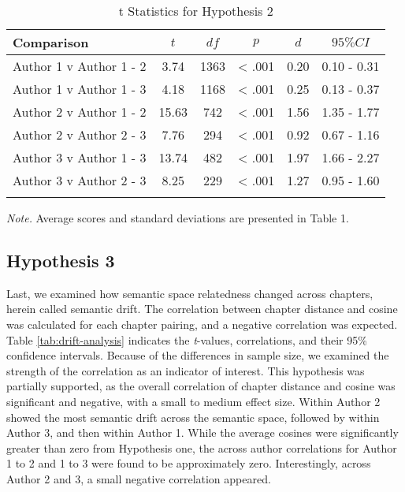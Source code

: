 \documentclass[english,man]{apa6}
\newcounter{author}
\theoremstyle{definition}
\theoremstyle{definition}
\theoremstyle{definition}
\theoremstyle{remark}
\begin{document}
\begin{table}[tbp]
\begin{center}
\begin{threeparttable}
\caption{\label{tab:correlation-exp2}t Statistics for Hypothesis 2}
\begin{tabular}{lccccc}
\toprule
Comparison & $t$ & $df$ & $p$ & $d$ & $95\% CI$\\
\midrule
Author 1 v Author 1 - 2 & 3.74 & 1363 & < .001 & 0.20 & 0.10  -  0.31\\
Author 1 v Author 1 - 3 & 4.18 & 1168 & < .001 & 0.25 & 0.13  -  0.37\\
Author 2 v Author 1 - 2 & 15.63 & 742 & < .001 & 1.56 & 1.35  -  1.77\\
Author 2 v Author 2 - 3 & 7.76 & 294 & < .001 & 0.92 & 0.67  -  1.16\\
Author 3 v Author 1 - 3 & 13.74 & 482 & < .001 & 1.97 & 1.66  -  2.27\\
Author 3 v Author 2 - 3 & 8.25 & 229 & < .001 & 1.27 & 0.95  -  1.60\\
\bottomrule
\addlinespace
\end{tabular}
\begin{tablenotes}[para]
\textit{Note.} Average scores and standard deviations are presented in Table 1.
\end{tablenotes}
\end{threeparttable}
\end{center}
\end{table}

\subsection{Hypothesis 3}\label{hypothesis-3-1}

Last, we examined how semantic space relatedness changed across
chapters, herein called semantic drift. The correlation between chapter
distance and cosine was calculated for each chapter pairing, and a
negative correlation was expected. Table \ref{tab:drift-analysis}
indicates the \emph{t}-values, correlations, and their 95\% confidence
intervals. Because of the differences in sample size, we examined the
strength of the correlation as an indicator of interest. This hypothesis
was partially supported, as the overall correlation of chapter distance
and cosine was significant and negative, with a small to medium effect
size. Within Author 2 showed the most semantic drift across the semantic
space, followed by within Author 3, and then within Author 1. While the
average cosines were significantly greater than zero from Hypothesis
one, the across author correlations for Author 1 to 2 and 1 to 3 were
found to be approximately zero. Interestingly, across Author 2 and 3, a
small negative correlation appeared.
\end{document}
